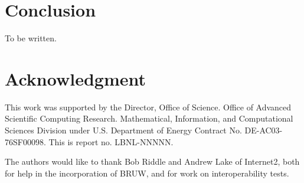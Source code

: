 \documentclass[conference]{IEEEtran}
\begin{document}
%


\section{Conclusion}
To be written.


\section*{Acknowledgment}
This work was supported by the Director, Office of Science. Office of
Advanced Scientific Computing Research. Mathematical, Information, and
Computational Sciences Division under U.S. Department of
Energy Contract No. DE-AC03-76SF00098. This is report no. LBNL-NNNNN.

The authors would like to thank Bob Riddle and Andrew Lake of Internet2, both
for help in the incorporation of BRUW, and for work on interoperability tests.


\end{document}

